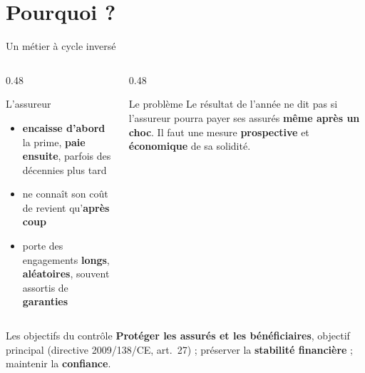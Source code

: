 \documentclass[10pt,aspectratio=169]{beamer}
\begin{document}
\section{Pourquoi ?}

\begin{frame}{Un métier à cycle inversé}
\begin{columns}[T]
\begin{column}{0.48\textwidth}
\begin{block}{L'assureur}
\begin{itemize}
  \item \textbf{encaisse d'abord} la prime, \textbf{paie ensuite}, parfois des décennies plus tard
  \item ne connaît son coût de revient qu'\textbf{après coup}
  \item porte des engagements \textbf{longs}, \textbf{aléatoires}, souvent assortis de \textbf{garanties}
\end{itemize}
\end{block}
\end{column}
\begin{column}{0.48\textwidth}
\begin{alertblock}{Le problème}
Le résultat de l'année ne dit pas si l'assureur pourra payer ses assurés \textbf{même après un
choc}. Il faut une mesure \textbf{prospective} et \textbf{économique} de sa solidité.
\end{alertblock}
\end{column}
\end{columns}
\vspace{0.4cm}
\begin{block}{Les objectifs du contrôle}
\textbf{Protéger les assurés et les bénéficiaires}, objectif principal (directive 2009/138/CE,
art.~27) ; préserver la \textbf{stabilité financière} ; maintenir la \textbf{confiance}.
\end{block}
\end{frame}
\end{document}
